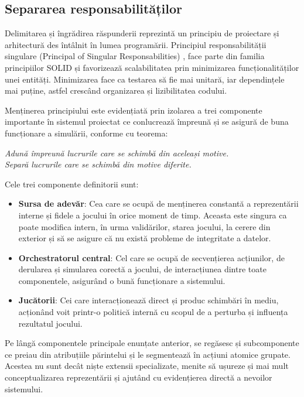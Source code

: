 \subsection{Separarea responsabilităților}
Delimitarea și îngrădirea răspunderii reprezintă un principiu de proiectare și arhitectură des întâlnit în lumea programării. Principiul responsabilității singulare (Principal of Singular Responsabilities) \cite{srp_desing_pattern}, face parte din familia principiilor SOLID \cite{solid_patterns} și favorizează scalabilitatea prin minimizarea funcționalităților unei entități. Minimizarea face ca testarea să fie mai unitară, iar dependințele mai puține, astfel crescând organizarea și lizibilitatea codului.

Menținerea principiului este evidențiată prin izolarea a trei componente importante în sistemul proiectat ce conlucrează împreună și se asigură de buna funcționare a simulării, conforme cu teorema:

\begin{displayquote}
\centering
\textit{Adună împreună lucrurile care se schimbă din aceleași motive. \\
Separă lucrurile care se schimbă din motive diferite.} \cite{srp_quote_source}
\end{displayquote}

Cele trei componente definitorii sunt:
\begin{itemize}
    \item \textbf{Sursa de adevăr}: Cea care se ocupă de menținerea constantă a reprezentării interne și fidele a jocului în orice moment de timp. Aceasta este singura ca poate modifica intern, în urma validărilor, starea jocului, la cerere din exterior și să se asigure că nu există probleme de integritate a datelor.
    \item \textbf{Orchestratorul central}: Cel care se ocupă de secvențierea acțiunilor, de derularea și simularea corectă a jocului, de interacțiunea dintre toate componentele, asigurând o bună funcționare a sistemului.
    \item \textbf{Jucătorii}: Cei care interacționează direct și produc schimbări în mediu, acționând voit printr-o politică internă cu scopul de a perturba și influența rezultatul jocului.
\end{itemize}

Pe lângă componentele principale enunțate anterior, se regăsesc și subcomponente ce preiau din atribuțiile părintelui și le segmentează în acțiuni atomice grupate. Acestea nu sunt decât niște extensii specializate, menite să ușureze și mai mult conceptualizarea reprezentării și ajutând cu evidențierea directă a nevoilor sistemului.

